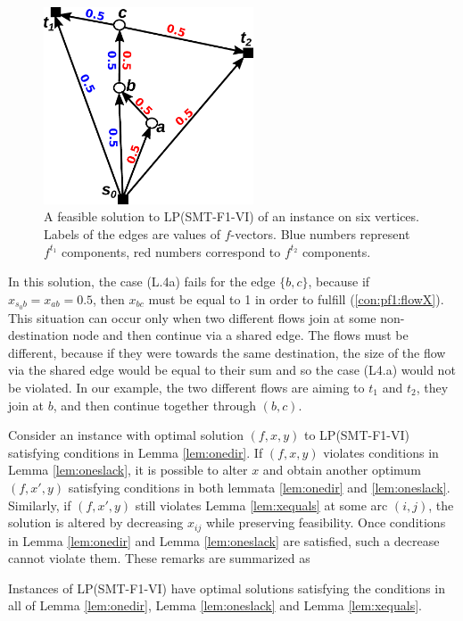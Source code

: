 \begin{figure}[h!]
        \centering
        \includegraphics[height=2.3in]{counterex}
        \caption{A feasible solution to LP(SMT-F1-VI) of an instance on six vertices. Labels of the edges are values of $f$-vectors. Blue numbers represent $f^{t_1}$ components, red numbers correspond to $f^{t_2}$ components.} 
                \label{fig:counterex}
\end{figure}
In this solution, the case (L.4a) fails for the edge $\{b,c\}$, because if $x_{s_0b}=x_{ab}=0.5$, then $x_{bc}$ must be equal to 1 in order to fulfill (\ref{con:pf1:flowX}). This situation can occur only when two different flows join at some non-destination node and then continue via a shared edge. The flows must be different, because if they were towards the same destination, the size of the flow via the shared edge would be equal to their sum and so the case (L4.a) would not be violated. In our example, the two different flows are aiming to $t_1$ and $t_2$, they join at $b$, and then continue together through $(b,c)$.

Consider an instance with optimal solution $(f,x,y)$ to LP(SMT-F1-VI) satisfying conditions in Lemma \ref{lem:onedir}. If $(f,x,y)$ violates conditions in Lemma \ref{lem:oneslack}, it is possible to alter $x$ and obtain another optimum $(f,x',y)$ satisfying conditions in both lemmata \ref{lem:onedir} and \ref{lem:oneslack}. Similarly, if $(f,x',y)$ still violates Lemma \ref{lem:xequals} at some arc $(i,j)$, the solution is altered by decreasing $x_{ij}$ while preserving feasibility. Once conditions in Lemma \ref{lem:onedir} and Lemma \ref{lem:oneslack} are satisfied, such a decrease cannot violate them. These remarks are summarized as 
\begin{obs}
Instances of LP(SMT-F1-VI) have optimal solutions satisfying the conditions in all of Lemma \ref{lem:onedir}, Lemma \ref{lem:oneslack} and Lemma \ref{lem:xequals}.
\end{obs}



